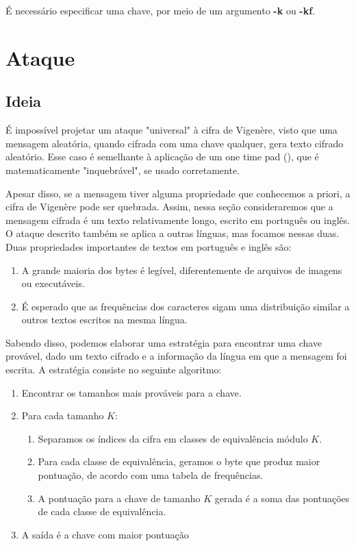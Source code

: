 \documentclass[conference]{IEEEtran}
\begin{document}
É necessário especificar uma chave, por meio de um argumento \textbf{-k} ou
\textbf{-kf}.


\section{Ataque} %
\label{sec:attack}

\subsection{Ideia}
É impossível projetar um ataque "universal" à cifra de Vigenère, visto que uma
mensagem aleatória, quando cifrada com uma chave qualquer, gera texto cifrado
aleatório. Esse caso é semelhante à aplicação de um one time pad
(\cite{one-time-pad}), que é matematicamente "inquebrável", se usado
corretamente.

Apesar disso, se a mensagem tiver alguma propriedade que conhecemos a priori, a
cifra de Vigenère pode ser quebrada. Assim, nessa seção consideraremos que a
mensagem cifrada é um texto relativamente longo, escrito em português ou inglês.
O ataque descrito também se aplica a outras línguas, mas focamos nessas duas.
Duas propriedades importantes de textos em português e inglês são:
\begin{enumerate}
    \item A grande maioria dos bytes é legível, diferentemente de arquivos de
        imagens ou executáveis.
    \item É esperado que as frequências dos caracteres sigam uma distribuição
        similar a outros textos escritos na mesma língua.
\end{enumerate}

Sabendo disso, podemos elaborar uma estratégia para encontrar uma chave
provável, dado um texto cifrado e a informação da língua em que a mensagem foi
escrita. A estratégia consiste no seguinte algoritmo:

\begin{enumerate}
    \item Encontrar os tamanhos mais prováveis para a chave.
    \item Para cada tamanho $K$:
        \begin{enumerate}
            \item Separamos os índices da cifra em classes de equivalência
                módulo $K$.
            \item Para cada classe de equivalência, geramos o byte que produz
                maior pontuação, de acordo com uma tabela de frequências. 
            \item A pontuação para a chave de tamanho $K$ gerada é a soma das
                pontuações de cada classe de equivalência.
        \end{enumerate}
    \item A saída é a chave com maior pontuação
\end{enumerate}
\end{document}
